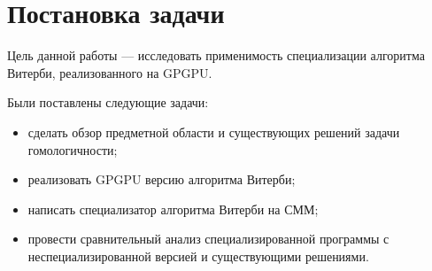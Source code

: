 \section{Постановка задачи}
Цель данной работы --- исследовать применимость специализации алгоритма Витерби, реализованного на GPGPU.

Были поставлены следующие задачи:
\begin{itemize}
	\item сделать обзор предметной области и существующих решений задачи 
		гомологичности;
	\item реализовать GPGPU версию алгоритма Витерби;
	\item написать специализатор алгоритма Витерби на СММ;
	\item провести сравнительный анализ специализированной программы с
		неспециализированной версией и существующими решениями.
\end{itemize}

